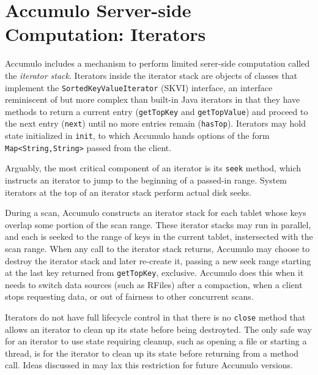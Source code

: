 






\section{Accumulo Server-side Computation: Iterators}
Accumulo includes a mechanism to perform limited serer-side computation called the 
\emph{iterator stack}.  Iterators inside the iterator stack are objects of classes
that implement the \texttt{SortedKeyValueIterator} (SKVI) interface, an interface
reminiscent of but more complex than built-in Java iterators %
in that they have methods to return a current entry (\texttt{getTopKey} and \texttt{getTopValue})
and proceed to the next entry (\texttt{next}) until no more entries remain (\texttt{hasTop}).
Iterators may hold state initialized in \texttt{init}, to which Accumulo hands 
options of the form \texttt{Map<String,String>} passed from the client.%

Arguably, the most critical component of an iterator is its \texttt{seek} method,
which instructs an iterator to jump to the beginning of a passed-in range. System iterators 
at the top of an iterator stack perform actual disk seeks.%

During a scan, Accumulo constructs an iterator stack for each tablet whose keys overlap some portion 
of the scan range. These iterator stacks may run in parallel, and each is seeked to the range of 
keys in the current tablet, instersected with the scan range. When any call to the iterator stack 
returns, Accumulo may choose to destroy the iterator stack and later re-create it,
passing a new seek range starting at the last key returned from \texttt{getTopKey}, exclusive.
Accumulo does this when it needs to switch data sources (such as RFiles) after a compaction, 
when a client stops requesting data, or out of fairness to other concurrent scans.

Iterators do not have full lifecycle control in that there is no \texttt{close} method 
that allows an iterator to clean up its state before being destroyted. The only safe way for an 
iterator to use state requiring cleanup, such as opening a file or starting a thread,
is for the iterator to clean up its state before returning from a method call.
Ideas discussed in \cite{ACCUMULO-3751} may lax this restriction for future Accumulo versions.


